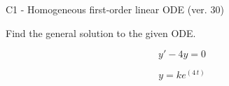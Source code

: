 \begin{exercise}
  \begin{exerciseTitle}C1 - Homogeneous first-order linear ODE (ver. 30)\end{exerciseTitle}
  \begin{exerciseStatement}
    
Find the general solution to the given ODE.

    
\[y'-4y=0\]

  \end{exerciseStatement}
  \begin{exerciseAnswer}
    
\[y= k e^{\left(4 \, t\right)}\]

  \end{exerciseAnswer}
\end{exercise}